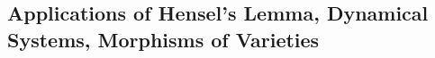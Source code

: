 \newpage
\subsection{Applications of Hensel's Lemma, Dynamical Systems, Morphisms of Varieties\label{sec:620_17}}